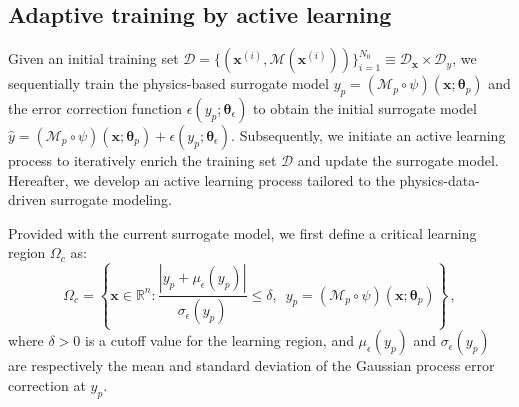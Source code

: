 \documentclass[number,preprint,3p]{elsarticle}
\def\rn{\mathbb{R}^n}
\newcommand{\1}[2]{\mathbb{I}_{#1}\left(#2\right)}
\newcommand{\vect}[1]{\boldsymbol{#1}}
\begin{document}
	\subsection{Adaptive training by active learning}\label{Sec:ActiveLearning}
	\noindent Given an initial training set $\mathcal{D}=\{(\vect x^{(i)},\mathcal{M}(\vect x^{(i)}))\}_{i=1}^{N_0}\equiv\mathcal{D}_{\vect x}\times\mathcal{D}_y$, we sequentially train the physics-based surrogate model $y_p=(\mathcal{M}_p\circ\psi)(\vect x;\vect\theta_p)$ and the error correction function $\epsilon(y_p;\vect\theta_\epsilon)$ to obtain the initial surrogate model $\hat y=(\mathcal{M}_p\circ\psi)(\vect x;\vect\theta_p)+\epsilon(y_p;\vect\theta_\epsilon)$. Subsequently, we initiate an active learning process to iteratively enrich the training set $\mathcal{D}$ and update the surrogate model. Hereafter, we develop an active learning process tailored to the physics-data-driven surrogate modeling. 
 
	
 
 Provided with the current surrogate model, we first define a critical learning region $\Omega_c$ as:
	\begin{equation}\label{LearningFun1}
		\Omega_c=\left \{ \vect{x}\in\rn:\frac{\left |y_{p}+\mu_{{\epsilon}}(y_{p})\right |}{\sigma_{{\epsilon}}(y_{p})} \leqslant \delta ,\,\,\, y_{p}=(\mathcal{M}_{p}\circ\psi)(\vect{x};\vect{\theta}_{p}) \right \}\,,
	\end{equation}
	where $\delta>0$ is a cutoff value for the learning region, and $\mu_\epsilon(y_p)$ and $\sigma_\epsilon(y_p)$ are respectively the mean and standard deviation of the Gaussian process error correction at $y_p$. 
 
\end{document}

